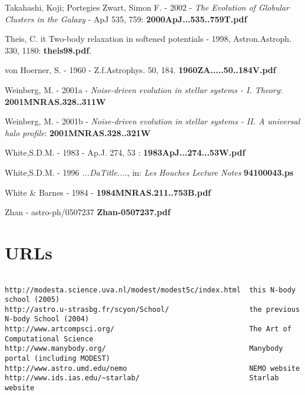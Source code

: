 \begin{itemize}
\begin{itemize}
Takahashi, Koji; Portegies Zwart, Simon F. - 2002 -
{\it The Evolution of Globular Clusters in the Galaxy} - ApJ 535, 759:
{\bf 2000ApJ...535..759T.pdf}

Theis, C. {it  Two-body relaxation in softened potentials} - 1998, Astron.Astroph. 330, 1180:
{\bf theis98.pdf}.

von Hoerner, S. - 1960 - Z.f.Astrophys. 50, 184.
{\bf 1960ZA.....50..184V.pdf}


Weinberg, M. - 2001a - 
{\it Noise-driven evolution in stellar systems - I. Theory}:
{\bf 2001MNRAS.328..311W}

Weinberg, M. - 2001b - 
{\it Noise-driven evolution in stellar systems - II. A universal halo profile}:
{\bf 2001MNRAS.328..321W}


White,S.D.M. - 1983 - Ap.J. 274, 53 : {\bf 1983ApJ...274...53W.pdf}

White,S.D.M. - 1996 {\it ...DaTitle....},
in: {\it Les Houches Lecture Notes}
{\bf 94100043.ps}

White \& Barnes - 1984 - {\bf 1984MNRAS.211..753B.pdf}

Zhan - astro-ph/0507237 {\bf Zhan-0507237.pdf}

\section*{URLs}

\footnotesize
\begin{verbatim}

http://modesta.science.uva.nl/modest/modest5c/index.html  this N-body school (2005)
http://astro.u-strasbg.fr/scyon/School/                   the previous N-body School (2004)
http://www.artcompsci.org/                                The Art of Computational Science
http://www.manybody.org/                                  Manybody portal (including MODEST)
http://www.astro.umd.edu/nemo                             NEMO website
http://www.ids.ias.edu/~starlab/                          Starlab website

\end{verbatim}
\normalsize


\appendix

\end{itemize}
\end{itemize}
